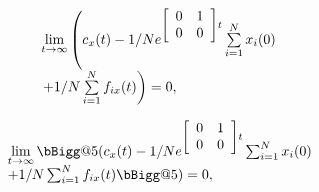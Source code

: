 \documentclass[UTF8,oneside]{ctexbook}
\begin{document}
\[\begin{array}{l}
\mathop{\lim}\limits_{t \to \infty} 
\left( 
{
    {c_x}(t)
    - {
        1 
        \mathord{
            \left/
                {\vphantom {1 N}} 
            \right.
            \kern-\nulldelimiterspace
        } 
        N
    } {
        e^	{
            \left[ {
                    \begin{array}{*{20}{c}}
                        0&1\\
                        0&0
                    \end{array}
            } \right]
            t
        }
    } \sum\limits_{i = 1}^N {{x_i}(0)} 
} \right.\\ %
\left.  { 
    + {
        1 \mathord{
            \left/
                {\vphantom {1 N}} 
            \right.
        \kern-\nulldelimiterspace} 
        N
    } \sum\limits_{i = 1}^N {{f_{ix}}(t)} 
} 
\right) = 0,
\end{array}\]

\makeatletter
\newcommand{\vast}{\bBigg@{4}}
\newcommand{\Vast}{\bBigg@{5}}
\makeatother


\[\begin{array}{l}
\mathop{\lim}\limits_{t \to \infty}
\Vast(
c_x(t)
-
1/Ne^{
    \left[ 
        \begin{array}{*{20}{c}}
            0 & 1 \\
            0 & 0 \\
        \end{array} 
    \right] 
    t
}
\sum_{i=1}^N{x_i(0)}
\\ +
1/N\sum_{i=1}^N{f_{ix}(t)}
\Vast) = 0,
\end{array}\]
\end{document}
